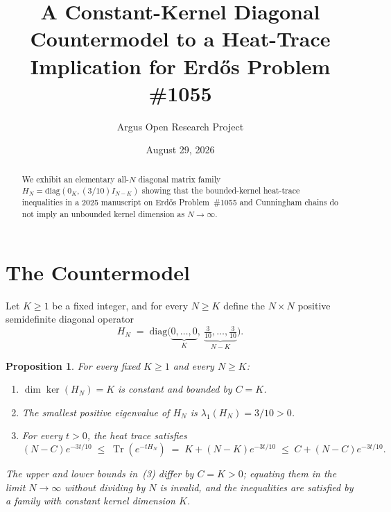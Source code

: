 \documentclass[10pt,reqno]{amsart}
\title[Countermodel to a Heat-Trace Implication for Erd\H{o}s Problem \#1055]
{A Constant-Kernel Diagonal Countermodel to a Heat-Trace Implication for Erd\H{o}s Problem \#1055}
\author{Argus Open Research Project}
\date{August 29, 2026}
\newtheorem{proposition}[theorem]{Proposition}
\theoremstyle{definition}
\begin{document}
\begin{abstract}
We exhibit an elementary all-$N$ diagonal matrix family $H_N=\mathrm{diag}(0_K,(3/10)I_{N-K})$ showing that the bounded-kernel heat-trace inequalities in a 2025 manuscript on Erd\H{o}s Problem~\#1055 and Cunningham chains do not imply an unbounded kernel dimension as $N\to\infty$.
\end{abstract}
\maketitle
\section{The Countermodel}
Let $K\ge 1$ be a fixed integer, and for every $N\ge K$ define the $N\times N$ positive semidefinite diagonal operator
\[
  H_N \;=\; \mathrm{diag}\bigl(\underbrace{0,\dots,0}_{K},\ \underbrace{\tfrac{3}{10},\dots,\tfrac{3}{10}}_{N-K}\bigr).
\]
\begin{proposition}
For every fixed $K\ge 1$ and every $N\ge K$:
\begin{enumerate}[label=\textup{(\arabic*)}]
  \item $\dim\ker(H_N) = K$ is constant and bounded by $C=K$.
  \item The smallest positive eigenvalue of $H_N$ is $\lambda_1(H_N) = 3/10 > 0$.
  \item For every $t>0$, the heat trace satisfies
  \[
    (N-C)e^{-3t/10} \;\le\; \operatorname{Tr}(e^{-t H_N}) \;=\; K + (N-K)e^{-3t/10} \;\le\; C + (N-C)e^{-3t/10}.
  \]
\end{enumerate}
The upper and lower bounds in~(3) differ by $C=K>0$; equating them in the limit $N\to\infty$ without dividing by $N$ is invalid, and the inequalities are satisfied by a family with constant kernel dimension $K$.
\end{proposition}
\end{document}
